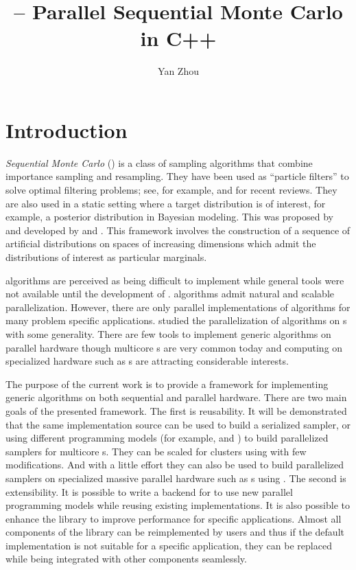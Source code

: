\documentclass[11pt, bib, hyper, mint, minted=cache]{marticle}
\title{\protect\vsmc{} -- Parallel Sequential Monte Carlo in C++}
\author{Yan Zhou}
\begin{document}
\maketitle

\section{Introduction}
\label{sec:Introduction}

\emph{Sequential Monte Carlo} (\smc) is a class of sampling algorithms that
combine importance sampling and resampling. They have been used as ``particle
filters'' to solve optimal filtering problems; see, for example,
\textcite{Cappe:2007hz} and \textcite{Doucet:2011us} for recent reviews. They
are also used in a static setting where a target distribution is of interest,
for example, a posterior distribution in Bayesian modeling. This was proposed
by \textcite{DelMoral:2006hc} and developed by \textcite{Peters:2005wh} and
\textcite{DelMoral:2006wv}. This framework involves the construction of a
sequence of artificial distributions on spaces of increasing dimensions which
admit the distributions of interest as particular marginals.

\Smc algorithms are perceived as being difficult to implement while general
tools were not available until the development of \fsmctc \parencite{smctc}.
\Smc algorithms admit natural and scalable parallelization. However, there are
only parallel implementations of \smc algorithms for many problem specific
applications. \textcite{Lee:2010fm} studied the parallelization of \smc
algorithms on \gpu{}s with some generality. There are few tools to implement
generic \smc algorithms on parallel hardware though multicore \cpu{}s are very
common today and computing on specialized hardware such as \gpu{}s are
attracting considerable interests.

The purpose of the current work is to provide a framework for implementing
generic \smc algorithms on both sequential and parallel hardware. There are
two main goals of the presented framework. The first is reusability. It will
be demonstrated that the same implementation source can be used to build a
serialized sampler, or using different programming models (for example,
\fopenmp and \ftbb) to build parallelized samplers for multicore \cpu{}s. They
can be scaled for clusters using \fmpi with few modifications. And with a
little effort they can also be used to build parallelized samplers on
specialized massive parallel hardware such as \gpu{}s using \fopencl. The
second is extensibility. It is possible to write a backend for \vsmc to use
new parallel programming models while reusing existing implementations. It is
also possible to enhance the library to improve performance for specific
applications. Almost all components of the library can be reimplemented by
users and thus if the default implementation is not suitable for a specific
application, they can be replaced while being integrated with other components
seamlessly.
\end{document}
